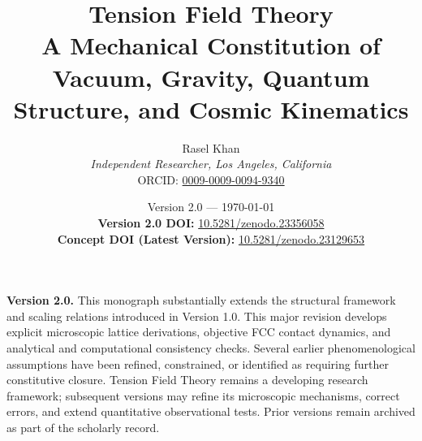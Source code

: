 \documentclass[11pt, letterpaper]{report}
\title{\textbf{Tension Field Theory}\\
\large A Mechanical Constitution of Vacuum, Gravity, Quantum Structure, and Cosmic Kinematics}
\author{Rasel Khan \\
\textit{Independent Researcher, Los Angeles, California} \\
ORCID: \href{https://orcid.org/0009-0009-0094-9340}{0009-0009-0094-9340}}
\date{\vspace{1.5em}
Version 2.0 --- \today \\
\vspace{0.5em}
\small \textbf{Version 2.0 DOI:} \href{https://doi.org/10.5281/zenodo.23356058}{10.5281/zenodo.23356058} \\
\small \textbf{Concept DOI (Latest Version):} \href{https://doi.org/10.5281/zenodo.23129653}{10.5281/zenodo.23129653}}
\begin{document}
\maketitle

\clearpage
\thispagestyle{empty}
\vspace*{\fill}
\noindent \textbf{Version 2.0.} This monograph substantially extends the structural framework and scaling relations introduced in Version 1.0. This major revision develops explicit microscopic lattice derivations, objective FCC contact dynamics, and analytical and computational consistency checks. Several earlier phenomenological assumptions have been refined, constrained, or identified as requiring further constitutive closure. Tension Field Theory remains a developing research framework; subsequent versions may refine its microscopic mechanisms, correct errors, and extend quantitative observational tests. Prior versions remain archived as part of the scholarly record.
\vspace{1in}
\clearpage
\end{document}
